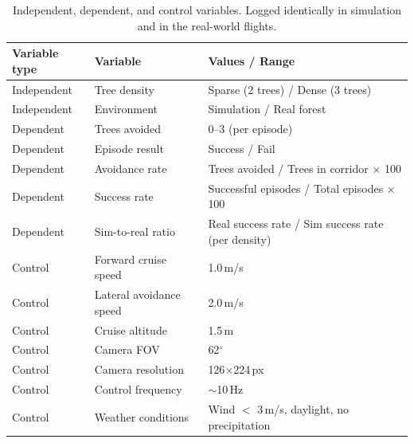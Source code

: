 \begin{table}[H]
    \small
    \centering
    \vspace*{\baselineskip}
    \caption{Independent, dependent, and control variables. Logged identically in simulation and in the real-world flights.}
    \label{tab:variables}
    \begin{tabular}{p{3cm} p{4cm} p{6cm}}
        \hline\hline
        \rowcolor{lightgray}\textbf{Variable type} & \textbf{Variable} & \textbf{Values / Range} \\\hline
        Independent & Tree density & Sparse (2 trees) / Dense (3 trees) \\
        \rowcolor{lightlightgray} Independent & Environment & Simulation / Real forest \\
        Dependent & Trees avoided & 0--3 (per episode) \\
        \rowcolor{lightlightgray} Dependent & Episode result & Success / Fail \\
        Dependent & Avoidance rate & Trees avoided / Trees in corridor $\times$ 100 \\
        \rowcolor{lightlightgray} Dependent & Success rate & Successful episodes / Total episodes $\times$ 100 \\
        Dependent & Sim-to-real ratio & Real success rate / Sim success rate (per density) \\
        \rowcolor{lightlightgray} Control & Forward cruise speed & 1.0\,m/s \\
        Control & Lateral avoidance speed & 2.0\,m/s \\
        \rowcolor{lightlightgray} Control & Cruise altitude & 1.5\,m \\
        Control & Camera FOV & 62$^{\circ}$ \\
        \rowcolor{lightlightgray} Control & Camera resolution & 126$\times$224\,px \\
        Control & Control frequency & $\sim$10\,Hz \\
        \rowcolor{lightlightgray} Control & Weather conditions & Wind $<$ 3\,m/s, daylight, no precipitation \\
        \hline
    \end{tabular}
\end{table}
